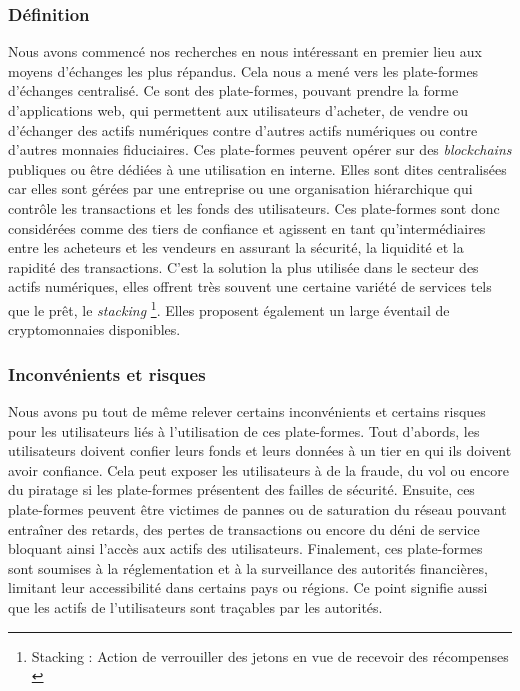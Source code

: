 \subsubsection{Définition}
Nous avons commencé nos recherches en nous intéressant en premier lieu aux moyens d'échanges les plus répandus. 
Cela nous a mené vers les plate-formes d'échanges centralisé. 
Ce sont des plate-formes, pouvant prendre la forme d'applications web, qui permettent aux utilisateurs d'acheter, de vendre ou d'échanger des actifs numériques contre d'autres actifs numériques ou contre d'autres monnaies fiduciaires. 
Ces plate-formes peuvent opérer sur des \textit{blockchains} publiques ou être dédiées à une utilisation en interne. 
Elles sont dites centralisées car elles sont gérées par une entreprise ou une organisation hiérarchique qui contrôle les transactions et les fonds des utilisateurs.
Ces plate-formes sont donc considérées comme des tiers de confiance et agissent en tant qu'intermédiaires entre les acheteurs et les vendeurs en assurant la sécurité, la liquidité et la rapidité des transactions.
C'est la solution la plus utilisée dans le secteur des actifs numériques, elles offrent très souvent une certaine variété de services tels que le prêt, le \textit{stacking} \footnote{Stacking : Action de verrouiller des jetons en vue de recevoir des récompenses \cite{defStack}}.
Elles proposent également un large éventail de cryptomonnaies disponibles.

\subsubsection{Inconvénients et risques}
Nous avons pu tout de même relever certains inconvénients et certains risques pour les utilisateurs liés à l'utilisation de ces plate-formes. 
Tout d'abords, les utilisateurs doivent confier leurs fonds et leurs données à un tier en qui ils doivent avoir confiance. 
Cela peut exposer les utilisateurs à de la fraude, du vol ou encore du piratage si les plate-formes présentent des failles de sécurité. 
Ensuite, ces plate-formes peuvent être victimes de pannes ou de saturation du réseau pouvant entraîner des retards, des pertes de transactions ou encore du déni de service bloquant ainsi l'accès aux actifs des utilisateurs. 
Finalement, ces plate-formes sont soumises à la réglementation et à la surveillance des autorités financières, limitant leur accessibilité dans certains pays ou régions. 
Ce point signifie aussi que les actifs de l'utilisateurs sont traçables par les autorités. 



